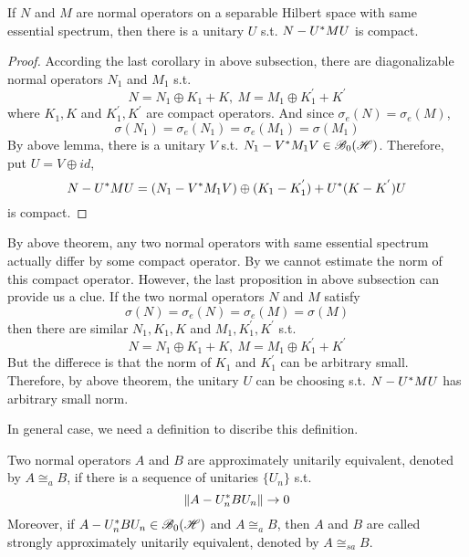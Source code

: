 \begin{thm}
	If $N$ and $M$ are normal operators on a separable Hilbert space with same essential spectrum, then there is a unitary $U$ s.t. $N-U^{*}MU$ is compact.
\end{thm}
\begin{proof}
	According the last corollary in above subsection, there are diagonalizable normal operators $N_1$ and $M_1$ s.t.
	\begin{equation*}
		N = N_1 \oplus K_1 + K, ~ M = M_1 \oplus K_1^{'} + K^{'}
	\end{equation*}
	where $K_1, K$ and $K_1^{'}, K^{'}$ are compact operators. And since $\sigma_e(N) = \sigma_e(M)$, 
	\begin{equation*}
		\sigma(N_1) = \sigma_e(N_1) = \sigma_e(M_1) = \sigma(M_1)
	\end{equation*}
	By above lemma, there is a unitary $V$ s.t. $N_1-V^{*}M_1V \in \mathscr{B}_{0}\mathscr{(H)}$. Therefore, put $U = V \oplus id$,
	\begin{equation*}
		N - U^{*}MU = (N_1-V^{*}M_1V) \oplus (K_1 - K_1^{'}) + U^{*}(K-K^{'})U 
	\end{equation*}
	is compact.
\end{proof}

By above theorem, any two normal operators with same essential spectrum actually differ by some compact operator. By we cannot estimate the norm of this compact operator. However, the last proposition in above subsection can provide us a clue. If the two normal operators $N$ and $M$ satisfy
\begin{equation*}
	\sigma(N) = \sigma_e(N) = \sigma_e(M) = \sigma(M)
\end{equation*}
then there are similar $N_1, K_1, K$ and $M_1,  K_1^{'}, K^{'}$ s.t.
\begin{equation*}
	N = N_1 \oplus K_1 + K, ~ M = M_1 \oplus K_1^{'} + K^{'}
\end{equation*}
But the differece is that the norm of $K_1$ and $K_1^{'}$ can be arbitrary small. Therefore, by above theorem, the unitary $U$ can be choosing s.t. $N - U^{*}MU$ has arbitrary small norm.

In general case, we need a definition to discribe this definition.

\begin{defn}
	Two normal operators $A$ and $B$ are approximately unitarily equivalent, denoted by $A \cong_a B$, if there is a sequence of unitaries $\{U_n\}$ s.t. 
	\begin{equation*}
		\left\lVert A - U_n^{*}BU_n\right\lVert \rightarrow 0
	\end{equation*}
	Moreover, if $A - U_n^{*}BU_n \in \mathscr{B}_{0}\mathscr{(H)}$ and $A \cong_a B$, then $A$ and $B$ are called strongly approximately unitarily equivalent, denoted by $A \cong_{sa} B$.
\end{defn}

